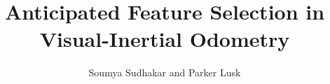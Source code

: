 \documentclass[letterpaper, 10 pt, conference]{ieeeconf}
\begin{document}
\title{Anticipated Feature Selection in Visual-Inertial Odometry}
\author{Soumya Sudhakar and Parker Lusk}
\maketitle










\end{document}
